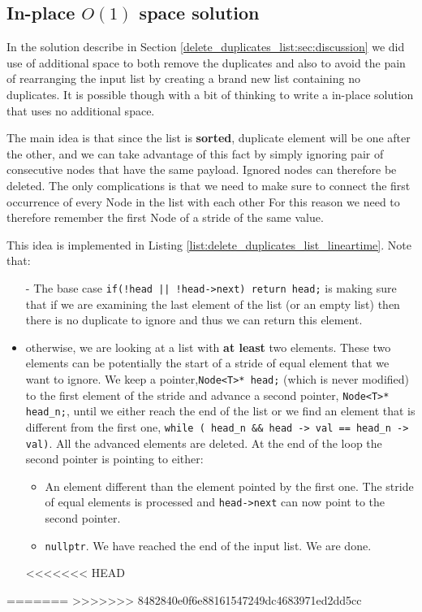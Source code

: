 \subsection{In-place $O(1)$ space solution}
\label{delete_duplicates_list:sec:linear_space}
In the solution describe in Section \ref{delete_duplicates_list:sec:discussion} we did use of additional space to both remove the duplicates and also to avoid the pain of rearranging the input list by creating a brand new list containing no duplicates. It is possible though with a bit of thinking to write a in-place solution that uses no additional space. 

The main idea is that since the list is \textbf{sorted}, duplicate element will be one after the other, and we can take advantage of this fact by simply ignoring pair of consecutive nodes that have the same payload. Ignored nodes can therefore be deleted. The only complications is that we need to make sure to connect the first occurrence of every Node in the list with each other For this reason we need to therefore remember the first Node of a stride of the same value.

This idea is implemented in Listing \ref{list:delete_duplicates_list_lineartime}. Note that:

\begin{itemize}
	\item[-] The base case \lstinline[columns=fixed]{if(!head || !head->next) return head;} is making sure that if we are examining the last element of the list (or an empty list) then there is no duplicate to ignore and thus we can return this element.
	\item[-] otherwise, we are looking at a list with \textbf{at least} two elements. These two elements can be potentially the start of a stride of equal element that we want to ignore. We keep a pointer,\lstinline[columns=fixed]{Node<T>* head;} (which is never modified) to the first element  of the stride and advance a second pointer, \lstinline[columns=fixed]{Node<T>* head_n;}, until we either reach the end of the list or we find an element that is different from the first one, \lstinline[columns=fixed]{while ( head_n && head -> val == head_n -> val)}. All the advanced elements are deleted. At the end of the loop the second pointer  is pointing to either:
	\begin{itemize}
		\item[-] An element different than the element pointed by the first one. The stride of equal elements is processed and  \lstinline[columns=fixed]{head->next} can now point to the second pointer.
		\item[-] \lstinline[columns=fixed]{nullptr}. We have reached the end of the input list. We are done.
	\end{itemize}
<<<<<<< HEAD
\end{itemize}
=======
>>>>>>> 8482840e0f6e88161547249dc4683971ed2dd5cc

